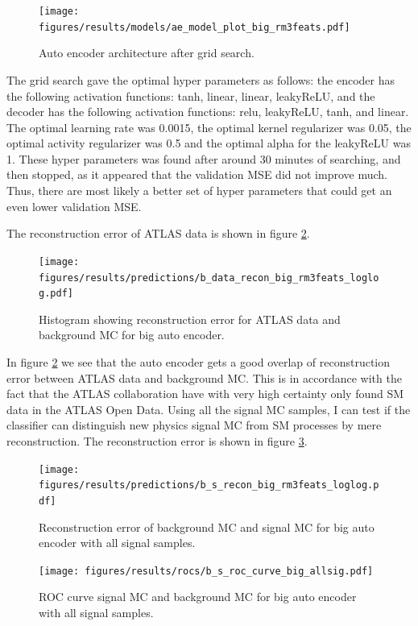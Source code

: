 \documentclass[ reprint, amsmath,amssymb, aps, nofootinbib]{revtex4-2}
\begin{document}
\begin{figure}[H]
    \centering
    \texttt{[image: figures/results/models/ae\_model\_plot\_big\_rm3feats.pdf]}
    \caption{Auto encoder architecture after grid search. }
    \label{fig:big_ae_plot}
\end{figure}
The grid search gave the optimal hyper parameters as follows: the encoder has the following activation functions: tanh, linear, linear, leakyReLU, and the decoder has the following activation functions: relu, leakyReLU, tanh, and linear. The optimal learning rate was 0.0015, the optimal kernel regularizer was 0.05, the optimal activity regularizer was 0.5 and the optimal alpha for the leakyReLU was 1. These hyper parameters was found after around 30 minutes of searching, and then stopped, as it appeared that the validation MSE did not improve much. Thus, there are most likely a better set of hyper parameters that could get an even lower validation MSE. \par 
The reconstruction error of ATLAS data is shown in figure \ref{fig:data_b_big_pred}.

\begin{figure}[H]
     \centering
         \texttt{[image: figures/results/predictions/b\_data\_recon\_big\_rm3feats\_loglog.pdf]}
         \caption{Histogram showing reconstruction error for ATLAS data and background MC for big auto encoder. }
     \label{fig:data_b_big_pred}
\end{figure}

In figure \ref{fig:data_b_big_pred} we see that the auto encoder gets a good overlap of reconstruction error between ATLAS data and background MC. This is in accordance with the fact that the ATLAS collaboration have with very high certainty only found SM data in the ATLAS Open Data. Using all the signal MC samples, I can test if the classifier can distinguish new physics signal MC from SM processes by mere reconstruction. The reconstruction error is shown in figure \ref{fig:s_b_big_pred_allsig}.


\begin{figure}[H]
     \centering
         \texttt{[image: figures/results/predictions/b\_s\_recon\_big\_rm3feats\_loglog.pdf]}
    \caption{Reconstruction error of background MC and signal MC for big auto encoder with all signal samples.  }
    \label{fig:s_b_big_pred_allsig}
\end{figure}


\begin{figure}[H]    
    
    \centering
         \texttt{[image: figures/results/rocs/b\_s\_roc\_curve\_big\_allsig.pdf]}
         \caption{ROC curve signal MC and background MC for big auto encoder with all signal samples.}
         \label{fig:s_b_big_roc_allsig}
\end{figure}
\end{document}
